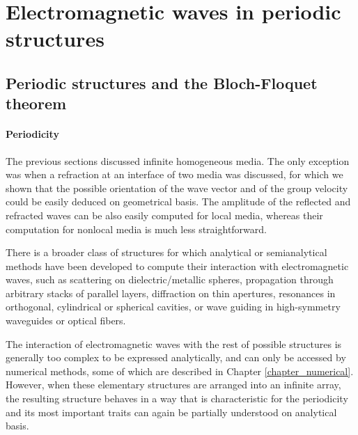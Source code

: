 
\section{Electromagnetic waves in periodic structures}
\subsection{Periodic structures and the Bloch-Floquet theorem}
\paragraph{Periodicity}%
The previous sections discussed infinite homogeneous media. The only exception was when a refraction at an interface of two media was discussed, for which we shown that the possible orientation of the wave vector and of the group velocity could be easily deduced on geometrical basis. The amplitude of the reflected and refracted waves can be also easily computed for local media, whereas their computation for nonlocal media is much less straightforward. 

There is a broader class of structures for which analytical or semianalytical methods have been developed to compute their interaction with electromagnetic waves, such as scattering on dielectric/metallic spheres, propagation through arbitrary stacks of parallel layers, diffraction on thin apertures, resonances in orthogonal, cylindrical or spherical cavities, or wave guiding in high-symmetry waveguides or optical fibers. 

The interaction of electromagnetic waves with the rest of possible structures is generally too complex to be expressed analytically, and can only be accessed by numerical methods, some of which are described in Chapter \ref{chapter_numerical}. However, when these elementary structures are arranged into an infinite array, the resulting structure behaves in a way that is characteristic for the periodicity and its most important traits can again be partially understood on analytical basis.

